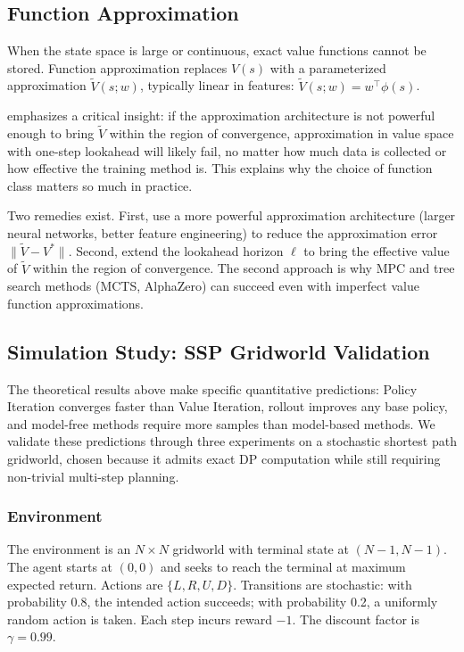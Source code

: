 \subsection{Function Approximation}
\label{sec:function_approx}

When the state space is large or continuous, exact value functions cannot be stored. Function approximation replaces $V(s)$ with a parameterized approximation $\tilde{V}(s; w)$, typically linear in features: $\tilde{V}(s; w) = w^\top \phi(s)$.

\citet{bertsekas2024} emphasizes a critical insight: if the approximation architecture is not powerful enough to bring $\tilde{V}$ within the region of convergence, approximation in value space with one-step lookahead will likely fail, no matter how much data is collected or how effective the training method is. This explains why the choice of function class matters so much in practice.

Two remedies exist. First, use a more powerful approximation architecture (larger neural networks, better feature engineering) to reduce the approximation error $\|\tilde{V} - V^*\|$. Second, extend the lookahead horizon $\ell$ to bring the effective value of $\tilde{V}$ within the region of convergence. The second approach is why MPC and tree search methods (MCTS, AlphaZero) can succeed even with imperfect value function approximations.


\subsection{Simulation Study: SSP Gridworld Validation}
\label{sec:simulation}

The theoretical results above make specific quantitative predictions: Policy Iteration converges faster than Value Iteration, rollout improves any base policy, and model-free methods require more samples than model-based methods. We validate these predictions through three experiments on a stochastic shortest path gridworld, chosen because it admits exact DP computation while still requiring non-trivial multi-step planning.

\subsubsection{Environment}

The environment is an $N \times N$ gridworld with terminal state at $(N-1, N-1)$. The agent starts at $(0,0)$ and seeks to reach the terminal at maximum expected return. Actions are $\{L, R, U, D\}$. Transitions are stochastic: with probability 0.8, the intended action succeeds; with probability 0.2, a uniformly random action is taken. Each step incurs reward $-1$. The discount factor is $\gamma = 0.99$.

